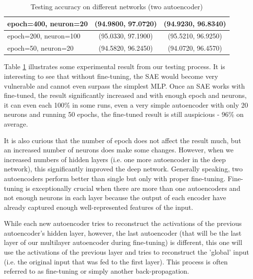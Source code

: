 \documentclass{article}
\begin{document}
\begin{table}[h!]
\begin{tabular}{lcc}
epoch=400, neuron=20  & (94.9800, 97.0720)                                                                                                 & (94.9230, 96.8340)                                                                                      \\ \hline
epoch=200, neuron=100 & (95.0330, 97.1900)                                                                                                 & (95.5210, 96.9250)                                                                                      \\ \hline
epoch=50, neuron=20   & (94.5820, 96.2450)                                                                                                 & (94.0720, 96.4570)                                                                                      \\ \hline
\end{tabular}
\caption{Testing accuracy on different networks (two autoencoder)}
\label{tab:sae}
\end{table}

Table \ref{tab:sae} illustrates some experimental result from our testing process. It is interesting to see that without fine-tuning, the SAE would become very vulnerable and cannot even surpass the simplest MLP. Once an SAE works with fine-tuned, the result significantly increased and with enough epoch and neurons, it can even each 100\% in some runs, even a very simple autoencoder with only 20 neurons and running 50 epochs, the fine-tuned result is still auspicious - 96\% on average. 

It is also curious that the number of epoch does not affect the result much, but an increased number of neurons does make some changes. However, when we increased numbers of hidden layers (i.e. one more autoencoder in the deep network), this significantly improved the deep network. Generally speaking, two autoencoders perform better than single but only with proper fine-tuning. Fine-tuning is exceptionally crucial when there are more than one autoencoders and not enough neurons in each layer because the output of each encoder have already captured enough well-represented features of the input. 

While each new autoencoder tries to reconstruct the activations of the previous autoencoder's hidden layer, however, the last autoencoder (that will be the last layer of our multilayer autoencoder during fine-tuning) is different, this one will use the activations of the previous layer and tries to reconstruct the 'global' input (i.e. the original input that was fed to the first layer). This process is often referred to as fine-tuning or simply another back-propagation. 
\end{document}
